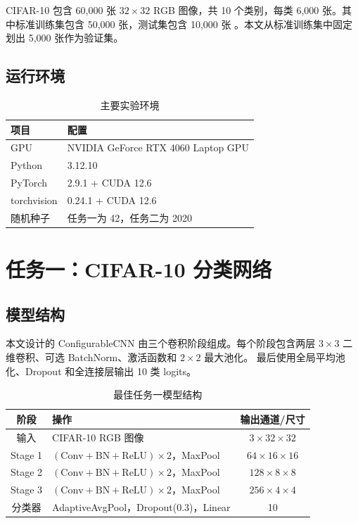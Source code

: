 \documentclass[UTF8,11pt,a4paper]{ctexart}
\begin{document}
CIFAR-10 包含 60,000 张 $32\times32$ RGB 图像，共 10 个类别，每类
6,000 张。其中标准训练集包含 50,000 张，测试集包含 10,000 张
\cite{cifar10}。本文从标准训练集中固定划出 5,000 张作为验证集。

\subsection{运行环境}

\begin{table}[H]
  \centering
  \caption{主要实验环境}
  \begin{tabular}{ll}
    \toprule
    项目 & 配置 \\
    \midrule
    GPU & NVIDIA GeForce RTX 4060 Laptop GPU \\
    Python & 3.12.10 \\
    PyTorch & 2.9.1 + CUDA 12.6 \\
    torchvision & 0.24.1 + CUDA 12.6 \\
    随机种子 & 任务一为 42，任务二为 2020 \\
    \bottomrule
  \end{tabular}
\end{table}

\section{任务一：CIFAR-10 分类网络}

\subsection{模型结构}

本文设计的 ConfigurableCNN 由三个卷积阶段组成。每个阶段包含两层
$3\times3$ 二维卷积、可选 BatchNorm、激活函数和 $2\times2$ 最大池化。
最后使用全局平均池化、Dropout 和全连接层输出 10 类 logits。

\begin{table}[H]
  \centering
  \caption{最佳任务一模型结构}
  \begin{tabular}{clc}
    \toprule
    阶段 & 操作 & 输出通道/尺寸 \\
    \midrule
    输入 & CIFAR-10 RGB 图像 & $3\times32\times32$ \\
    Stage 1 & $(\mathrm{Conv}+\mathrm{BN}+\mathrm{ReLU})\times2$，MaxPool
            & $64\times16\times16$ \\
    Stage 2 & $(\mathrm{Conv}+\mathrm{BN}+\mathrm{ReLU})\times2$，MaxPool
            & $128\times8\times8$ \\
    Stage 3 & $(\mathrm{Conv}+\mathrm{BN}+\mathrm{ReLU})\times2$，MaxPool
            & $256\times4\times4$ \\
    分类器 & AdaptiveAvgPool，Dropout(0.3)，Linear & 10 \\
    \bottomrule
  \end{tabular}
\end{table}
\end{document}
